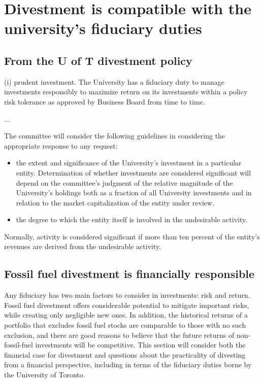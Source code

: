 


		\section {Divestment is compatible with the university's fiduciary duties}
		\label{sec:Fiduciary}



		\subsection {From the U of T divestment policy}
		
		
		
\begin{itquote}    
(i) prudent investment. The University has a fiduciary duty to manage investments responsibly to maximize return on its investments within a policy risk tolerance as approved by Business Board from time to time.

...

The committee will consider the following guidelines in considering the appropriate response to any request:
\begin{itemize}
  \item the extent and significance of the University's investment in a particular entity. Determination of whether investments are considered significant will depend on the committee's judgment of the relative magnitude of the University's holdings both as a fraction of all University investments and in relation to the market capitalization of the entity under review.
  \item the degree to which the entity itself is involved in the undesirable activity.
\end{itemize}
Normally, activity is considered significant if more than ten percent of the entity's revenues are derived from the undesirable activity.
\end{itquote}



	\subsection{Fossil fuel divestment is financially responsible}

	

Any fiduciary has two main factors to consider in investments: risk and return.
Fossil fuel divestment offers considerable potential to mitigate important risks, while creating only negligible new ones.
In addition, the historical returns of a portfolio that excludes fossil fuel stocks are comparable to those with no such exclusion, and there are good reasons to believe that the future returns of non-fossil-fuel investments will be competitive.
This section will consider both the financial case for divestment and questions about the practicality of divesting from a financial perspective, including in terms of the fiduciary duties borne by the University of Toronto.



